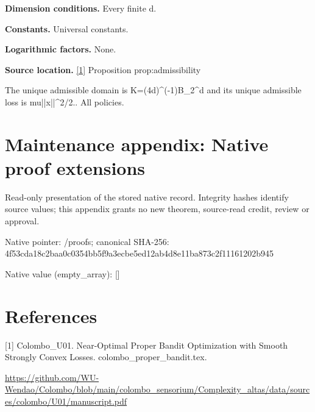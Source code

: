 \documentclass[10pt,a4paper]{article}
\begin{document}
\textbf{Dimension conditions.} Every finite d.



\textbf{Constants.} Universal constants.



\textbf{Logarithmic factors.} None.



\textbf{Source location.} \href{https://github.com/WU-Wendao/Colombo/blob/main/colombo_sensorium/Complexity_altas/data/sources/colombo/U01/manuscript.pdf}{[1]} Proposition prop:admissibility



The unique admissible domain is K=(4d)\textasciicircum{}(-1)B\_2\textasciicircum{}d and its unique admissible loss is mu||x||\textasciicircum{}2/2.. All policies.



\section{Maintenance appendix: Native proof extensions}


Read-only presentation of the stored native record. Integrity hashes identify source values; this appendix grants no new theorem, source-read credit, review or approval.



Native pointer: /proofs; canonical SHA-256: 4f53cda18c2baa0c0354bb5f\allowbreak{}9a3ecbe5ed12ab4d8e11ba87\allowbreak{}3c2f11161202b945



Native value (empty\_array): []



\section{References}


[1] Colombo\_U01. Near-Optimal Proper Bandit Optimization with Smooth Strongly Convex Losses. colombo\_proper\_bandit.tex.



\url{https://github.com/WU-Wendao/Colombo/blob/main/colombo_sensorium/Complexity_altas/data/sources/colombo/U01/manuscript.pdf}
\end{document}
